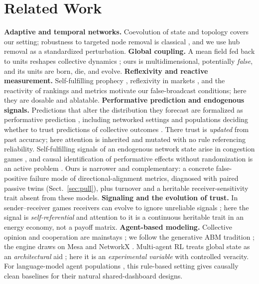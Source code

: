 \documentclass{svproc}
\begin{document}
\section{Related Work}
\textbf{Adaptive and temporal networks.} Coevolution of state and topology
\cite{gross2008adaptive,holme2012temporal} covers our setting; robustness to
targeted node removal is classical \cite{albert2000error}, and we use hub
removal as a standardized perturbation.
\textbf{Global coupling.} A mean field fed back to units reshapes collective
dynamics \cite{kuramoto1984chemical}; ours is multidimensional, potentially
\emph{false}, and its units are born, die, and evolve.
\textbf{Reflexivity and reactive measurement.} Self-fulfilling prophecy
\cite{merton1948self}, reflexivity in markets \cite{soros2013fallibility}, and
the reactivity of rankings and metrics
\cite{espeland2007rankings,strathern1997improving} motivate our
false-broadcast conditions; here they are dosable and ablatable.
\textbf{Performative prediction and endogenous signals.} Predictions that
alter the distribution they forecast are formalized as performative
prediction \cite{perdomo2020performative,hardt2025performative}, including
networked settings \cite{wang2023network} and populations deciding whether to
trust predictions of collective outcomes \cite{gois2024performative}. There
trust is \emph{updated} from past accuracy; here attention is inherited and
mutated with no rule referencing reliability. Self-fulfilling signals of an
endogenous network state arise in congestion games \cite{iwase2017self}, and
causal identification of performative effects without randomization is an
active problem \cite{cheng2024causal}. Ours is narrower and complementary: a
concrete false-positive failure mode of directional-alignment metrics,
diagnosed with paired passive twins (Sect.~\ref{sec:pull}), plus turnover and
a heritable receiver-sensitivity trait absent from these models.
\textbf{Signaling and the evolution of trust.} In sender--receiver games
receivers can evolve to ignore unreliable signals \cite{skyrms2010signals};
here the signal is \emph{self-referential} and attention to it is a
continuous heritable trait in an energy economy, not a payoff matrix.
\textbf{Agent-based modeling.} Collective opinion and cooperation are
mainstays \cite{castellano2009statistical,perc2017statistical}; we follow the
generative ABM tradition \cite{epstein1996growing,bonabeau2002agent}; the
engine draws on Mesa \cite{kazil2020mesa} and NetworkX
\cite{hagberg2008exploring}. Multi-agent RL treats global state as an
\emph{architectural} aid \cite{foerster2016learning}; here it is an
\emph{experimental variable} with controlled veracity. For language-model
agent populations \cite{park2023generative}, this rule-based setting gives
causally clean baselines for their natural shared-dashboard designs.
\end{document}
